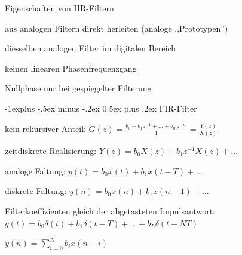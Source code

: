 \documentclass[a4paper]{article}
\makeatletter
\renewcommand{\subsection}{\@startsection{subsection}{2}{0mm}%
 {-1explus -.5ex minus -.2ex}%
 {0.5ex plus .2ex}%
 {\normalfont\normalsize\bfseries}}
\makeatother
\begin{document}
\begin{multicols}{3}

  Eigenschaften von IIR-Filtern
  \begin{itemize*}
    \item aus analogen Filtern direkt herleiten (analoge ,,Prototypen'')
    \item diesselben analogen Filter im digitalen Bereich
    \item keinen linearen Phasenfrequenzgang
    \item Nullphase nur bei gespiegelter Filterung
  \end{itemize*}

  \subsection{FIR-Filter}\label{fir-filter}
  \begin{itemize*}
    \item kein rekursiver Anteil: $G(z)=\frac{b_0+b_1z^{-1}+...+b_mz^{-m}}{1}=\frac{Y(z)}{X(z)}$
    \item zeitdiskrete Realisierung: $Y(z)=b_0X(z)+b_1z^{-1}X(z)+...$
    \item analoge Faltung: $y(t)=b_0x(t)+b_1x(t-T)+...$
    \item diskrete Faltung: $y(n)=b_0x(n)+b_1x(n-1)+...$
    \item Filterkoeffizienten gleich der abgetasteten Impulsantwort: $g(t)=b_0\delta(t)+b_1\delta(t-T)+...+b_L\delta(t-NT)$
    \item $y(n)=\sum_{i=0}^N b_ix(n-i)$
  \end{itemize*}


\end{multicols}
\end{document}
